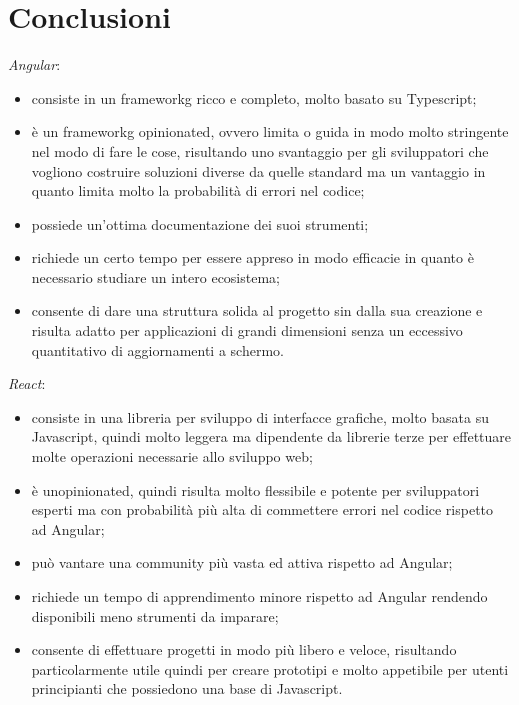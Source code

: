 
\section{Conclusioni}

\textit{Angular}:
\begin{itemize}
	\item consiste in un \gls{frameworkg} ricco e completo, molto basato su Typescript;
	\item è un \gls{frameworkg} opinionated, ovvero limita o guida in modo molto stringente nel modo di fare le cose, risultando uno svantaggio per gli sviluppatori che vogliono costruire soluzioni diverse da quelle standard ma un vantaggio in quanto limita molto la probabilità di errori nel codice;
	\item possiede un'ottima documentazione dei suoi strumenti;
	\item richiede un certo tempo per essere appreso in modo efficacie in quanto è necessario studiare un intero ecosistema;
	\item consente di dare una struttura solida al progetto sin dalla sua creazione e risulta adatto per applicazioni di grandi dimensioni senza un eccessivo quantitativo di aggiornamenti a schermo. \\
\end{itemize}
\textit{React}:
\begin{itemize}
	\item consiste in una libreria per sviluppo di interfacce grafiche, molto basata su Javascript, quindi molto leggera ma dipendente da librerie terze per effettuare molte operazioni necessarie allo sviluppo web;
	\item è unopinionated, quindi risulta molto flessibile e potente per sviluppatori esperti ma con probabilità più alta di commettere errori nel codice rispetto ad Angular;
	\item può vantare una community più vasta ed attiva rispetto ad Angular;
	\item richiede un tempo di apprendimento minore rispetto ad Angular rendendo disponibili meno strumenti da imparare;
	\item consente di effettuare progetti in modo più libero e veloce, risultando particolarmente utile quindi per creare prototipi e molto appetibile per utenti principianti che possiedono una base di Javascript. \\ \\
\end{itemize}
